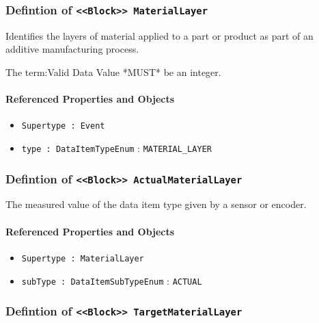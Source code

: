 \subsubsection{Defintion of \texttt{<<Block>> MaterialLayer}}
  \label{type:MaterialLayer}

\FloatBarrier

Identifies the layers of material applied to a part or product as part of an additive manufacturing process.
  
 The {term:Valid Data Value} *MUST* be an integer.

\FloatBarrier
\paragraph{Referenced Properties and Objects}

\begin{itemize}
\item \texttt{Supertype : Event}

\item \texttt{type : DataItemTypeEnum} : \texttt{MATERIAL_LAYER}

\end{itemize}
\FloatBarrier
\subsubsection{Defintion of \texttt{<<Block>> ActualMaterialLayer}}
  \label{type:ActualMaterialLayer}

\FloatBarrier

The measured value of the data item type given by a sensor or encoder.

\FloatBarrier
\paragraph{Referenced Properties and Objects}

\begin{itemize}
\item \texttt{Supertype : MaterialLayer}

\item \texttt{subType : DataItemSubTypeEnum} : \texttt{ACTUAL}

\end{itemize}
\FloatBarrier
\subsubsection{Defintion of \texttt{<<Block>> TargetMaterialLayer}}
  \label{type:TargetMaterialLayer}


